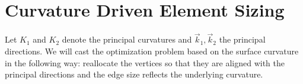 \documentclass[titlepage]{article}
\begin{document}
  
  
  
  
  
  
  
  
  
  
  
  
  
  
  \section{Curvature Driven Element Sizing}
  Let $K_1$ and $K_2$ denote the principal curvatures and $\vec k_1, \vec k_2$ the principal directions. 
  We will cast the optimization problem based on the surface curvature in the following way: reallocate the vertices so that they are 
  aligned with the principal directions and the edge size reflects the underlying curvature. 
  
\end{document}

